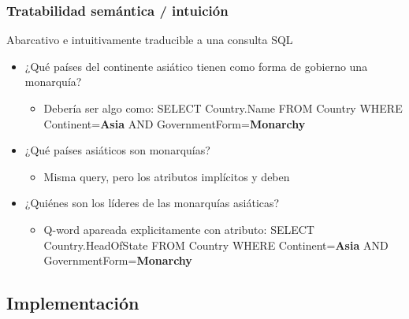 \begin{frame}[<+->]
  \frametitle{Tratabilidad semántica / intuición}
    \begin{exampleblock}{Abarcativo e intuitivamente traducible a una consulta SQL}
      \begin{itemize}
          \item ¿{\color{green}Qué} {\color{orange}países} del {\color{blue}continente} {\color{blue}asiático} tienen como {\color{blue}forma} de {\color{blue}gobierno} una {\color{blue}monarquía}?
            \begin{itemize}
              \item Debería ser algo como: {\color{purple}SELECT} Country.Name {\color{purple}FROM} Country {\color{purple}WHERE} Continent=\textbf{Asia} {\color{purple}AND} GovernmentForm=\textbf{Monarchy}
            \end{itemize}
            \item ¿{\color{green}Qué} {\color{orange}países} {\color{red}asiáticos} son {\color{red}monarquías}?
            \begin{itemize}
              \item Misma query, pero los atributos implícitos y deben 
            \end{itemize}
            \item ¿{\color{green}Quiénes} son los {\color{green}líderes} de las {\color{red}monarquías} {\color{red}asiáticas}?
            \begin{itemize}
              \item Q-word apareada explicitamente con atributo: {\color{purple}SELECT} Country.HeadOfState {\color{purple}FROM} Country {\color{purple}WHERE} Continent=\textbf{Asia} {\color{purple}AND} GovernmentForm=\textbf{Monarchy}
            \end{itemize}
      \end{itemize}
    \end{exampleblock}
    
\end{frame}

\subsection{Implementación}


